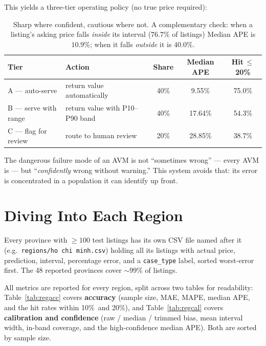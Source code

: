 \documentclass[11pt]{article}
\newcommand{\pct}{\%}
\begin{document}
This yields a three-tier operating policy (no true price required):

\begin{table}[h]
\centering
\begin{tabular}{llccc}
\toprule
\textbf{Tier} & \textbf{Action} & \textbf{Share} & \textbf{Median APE} & \textbf{Hit\,$\leq$20\pct} \\
\midrule
A --- auto-serve      & return value automatically      & 40\pct & 9.55\pct  & 75.0\pct \\
B --- serve with range& return value with P10--P90 band & 40\pct & 17.64\pct & 54.3\pct \\
C --- flag for review & route to human review           & 20\pct & 28.85\pct & 38.7\pct \\
\bottomrule
\end{tabular}
\caption{Sharp where confident, cautious where not. A complementary check: when a listing's asking
price falls \emph{inside} its interval ($76.7\pct$ of listings) Median APE is $10.9\pct$; when it
falls \emph{outside} it is $40.0\pct$.}
\end{table}

\noindent The dangerous failure mode of an AVM is not ``sometimes wrong'' --- every AVM is --- but
``\emph{confidently} wrong without warning.'' This system avoids that: its error is concentrated in a
population it can identify up front.

\section{Diving Into Each Region}\label{sec:regional}
Every province with $\geq 100$ test listings has its own CSV file named after it (e.g.\
\texttt{regions/ho chi minh.csv}) holding all its listings with actual price, prediction, interval,
percentage error, and a \texttt{case\_type} label, sorted worst-error first. The 48 reported
provinces cover $\sim 99\pct$ of listings.

All metrics are reported for every region, split across two tables for readability:
Table~\ref{tab:regacc} covers \textbf{accuracy} (sample size, MAE, MAPE, median APE, and the hit
rates within 10\pct\ and 20\pct), and Table~\ref{tab:regcal} covers \textbf{calibration and
confidence} (raw / median / trimmed bias, mean interval width, in-band coverage, and the
high-confidence median APE). Both are sorted by sample size.
\end{document}
